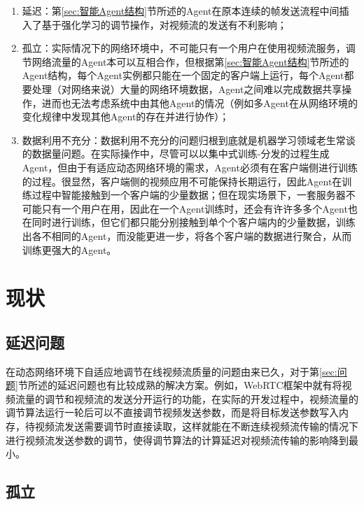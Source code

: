 \documentclass[a4paper]{ctexart}
\begin{document}
\begin{enumerate}[label=\arabic*、]
	\item 延迟：第\ref{sec:智能Agent结构}节所述的Agent在原本连续的帧发送流程中间插入了基于强化学习的调节操作，对视频流的发送有不利影响；
	\item 孤立：实际情况下的网络环境中，不可能只有一个用户在使用视频流服务，调节网络流量的Agent本可以互相合作，但根据第\ref{sec:智能Agent结构}节所述的Agent结构，每个Agent实例都只能在一个固定的客户端上运行，每个Agent都要处理（对网络来说）大量的网络环境数据，Agent之间难以完成数据共享操作，进而也无法考虑系统中由其他Agent的情况（例如多Agent在从网络环境的变化规律中发现其他Agent的存在并进行协作\cite{xuCollaborateSeparateDistributed2020}）；
	\item 数据利用不充分：数据利用不充分的问题归根到底就是机器学习领域老生常谈的数据量问题。在实际操作中，尽管可以以集中式训练-分发的过程生成Agent，但由于有适应动态网络环境的需求，Agent必须有在客户端侧进行训练的过程。很显然，客户端侧的视频应用不可能保持长期运行，因此Agent在训练过程中智能接触到一个客户端的少量数据；但在现实场景下，一套服务器不可能只有一个用户在用，因此在一个Agent训练时，还会有许许多多个Agent也在同时进行训练，但它们都只能分别接触到单个个客户端内的少量数据，训练出各不相同的Agent，而没能更进一步，将各个客户端的数据进行聚合，从而训练更强大的Agent。
\end{enumerate}

\section{现状}

\subsection{延迟问题}

在动态网络环境下自适应地调节在线视频流质量的问题由来已久，对于第\ref{sec:问题}节所述的延迟问题也有比较成熟的解决方案。例如，WebRTC框架中就有将视频流量的调节和视频流的发送分开运行的功能\cite{WebRTCRealTimeCommunicationBrowsers}，在实际的开发过程中，视频流量的调节算法运行一轮后可以不直接调节视频发送参数，而是将目标发送参数写入内存，待视频流发送需要调节时直接读取，这样就能在不断连续视频流传输的情况下进行视频流发送参数的调节，使得调节算法的计算延迟对视频流传输的影响降到最小。

\subsection{孤立}\label{subsec:孤立}
\end{document}
